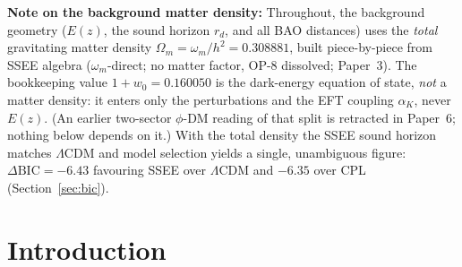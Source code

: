 \documentclass[12pt,a4paper]{article}
\begin{document}
\begin{abstract}
$0.88\sigma$. The cold sector $1+w_0=0.160050$ enters the perturbations
(Papers~3 and~6) and the EFT coupling, \emph{not} the background geometry;
an earlier ``$21.3\sigma$'' figure came from comparing that partial sector
against the Planck \emph{total} $\Omega_m$ --- a category error corrected here.
The two-sector $\phi$-DM framework once invoked to explain how the total
density partitions across scales has since been retracted (Paper~6): the
subtraction defining the second sector mixed a measured density with an
equation-of-state number. The results reported here do not depend on it ---
they use the total $\Omega_m$ throughout, which is what the correction of the
category error above already required.
\end{abstract}

\noindent\textbf{Note on the background matter density:} Throughout, the
background geometry ($E(z)$, the sound horizon $r_d$, and all BAO distances)
uses the \emph{total} gravitating matter density $\Omega_m=\omega_m/h^2=0.308881$,
built piece-by-piece from SSEE algebra ($\omega_m$-direct; no matter factor,
OP-8 dissolved; Paper~3). The bookkeeping value $1+w_0=0.160050$ is the dark-energy
equation of state, \emph{not} a matter density: it enters only the perturbations
and the EFT coupling $\alpha_K$, never $E(z)$. (An earlier two-sector
$\phi$-DM reading of that split is retracted in Paper~6; nothing below depends
on it.) With the total density the SSEE sound horizon matches
$\Lambda$CDM and model selection yields a single, unambiguous figure:
$\Delta\mathrm{BIC}=-6.43$ favouring SSEE over $\Lambda$CDM and $-6.35$ over CPL
(Section~\ref{sec:bic}).


\clearpage
{\small\tableofcontents}
\clearpage

\section{Introduction}
\label{sec:intro}
\end{document}
